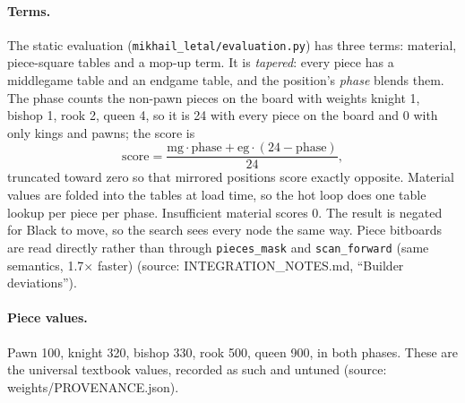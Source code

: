 \documentclass[11pt,a4paper]{article}
\newcommand{\src}[1]{{\small(source: #1)}}
\newcommand{\code}[1]{\texttt{#1}}
\begin{document}
\paragraph{Terms.} The static evaluation (\code{mikhail\_letal/evaluation.py}) has three terms: material,
piece-square tables and a mop-up term. It is \emph{tapered}: every piece has a middlegame table and an
endgame table, and the position's \emph{phase} blends them. The phase counts the non-pawn pieces on the
board with weights knight 1, bishop 1, rook 2, queen 4, so it is 24 with every piece on the board and 0
with only kings and pawns; the score is
\[
  \mathrm{score} = \frac{\mathrm{mg} \cdot \mathrm{phase} + \mathrm{eg} \cdot (24 - \mathrm{phase})}{24},
\]
truncated toward zero so that mirrored positions score exactly opposite. Material values are folded into
the tables at load time, so the hot loop does one table lookup per piece per phase. Insufficient material
scores 0. The result is negated for Black to move, so the search sees every node the same way. Piece
bitboards are read directly rather than through \code{pieces\_mask} and \code{scan\_forward} (same
semantics, 1.7$\times$ faster) \src{INTEGRATION\_NOTES.md, ``Builder deviations''}.

\paragraph{Piece values.} Pawn 100, knight 320, bishop 330, rook 500, queen 900, in both phases. These
are the universal textbook values, recorded as such and untuned \src{weights/PROVENANCE.json}.
\end{document}
